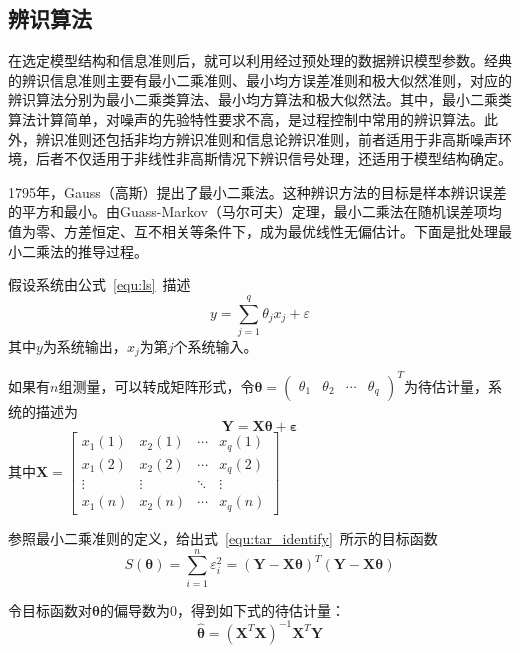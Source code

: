 \subsection{辨识算法}
在选定模型结构和信息准则后，就可以利用经过预处理的数据辨识模型参数。经典的辨识信息准则主要有最小二乘准则、最小均方误差准则和极大似然准则，对应的辨识算法分别为最小二乘类算法、最小均方算法和极大似然法。其中，最小二乘类算法计算简单，对噪声的先验特性要求不高，是过程控制中常用的辨识算法。此外，辨识准则还包括非均方辨识准则和信息论辨识准则，前者适用于非高斯噪声环境，后者不仅适用于非线性非高斯情况下辨识信号处理，还适用于模型结构确定\cite{陈霸东2011系统参数辨识的信息准则及算法}。

1795年，Gauss（高斯）提出了最小二乘法。这种辨识方法的目标是样本辨识误差的平方和最小。由Guass-Markov（马尔可夫）定理，最小二乘法在随机误差项均值为零、方差恒定、互不相关等条件下，成为最优线性无偏估计\cite{montgomery2015introduction}。下面是批处理最小二乘法的推导过程。

假设系统由公式~\ref{equ:ls}~描述
\begin{equation}
\label{equ:ls}
y = \sum_{j=1}^{q}{\theta_{j}}{x_{j}}+\varepsilon
\end{equation}
其中$y$为系统输出，$x_{j}$为第$j$个系统输入。

如果有$n$组测量，可以转成矩阵形式，令$\bm{\theta} = {\begin{pmatrix} \theta_{1} & \theta_{2} &\cdots & \theta_{q} \end{pmatrix}}^{T}$为待估计量，系统的描述为 
\begin{equation}
\bm{Y} = \bm{X}\bm{\theta} + \bm{\varepsilon}
\end{equation}
其中$\bm{X} = \left[{\begin{array}{cccc}
x_{1}{(1)}  & x_{2}{(1)}&\cdots&x_{q}{(1)}\\
x_{1}{(2)}  & x_{2}{(2)}&\cdots&x_{q}{(2)}\\
\vdots & \vdots &\ddots  &\vdots\\
x_{1}{(n)}  & x_{2}{(n)}&\cdots&x_{q}{(n)}
\end{array}}\right]$

参照最小二乘准则的定义，给出式~\ref{equ:tar_identify}~所示的目标函数
\begin{equation}
\label{equ:tar_identify}
{S}(\bm{\theta})=\sum_{i=1}^{n}{\varepsilon_{i}^{2}}=(\bm{Y}-\bm{X}\bm{\theta})^{T}(\bm{Y}-\bm{X}\bm{\theta})
\end{equation}

令目标函数对$\bm{\theta}$的偏导数为0，得到如下式的待估计量：
\begin{equation}
{\bm{\hat{\theta}}}=(\bm{X}^{T}\bm{X})^{-1}\bm{X}^{T}\bm{Y}
\end{equation}

